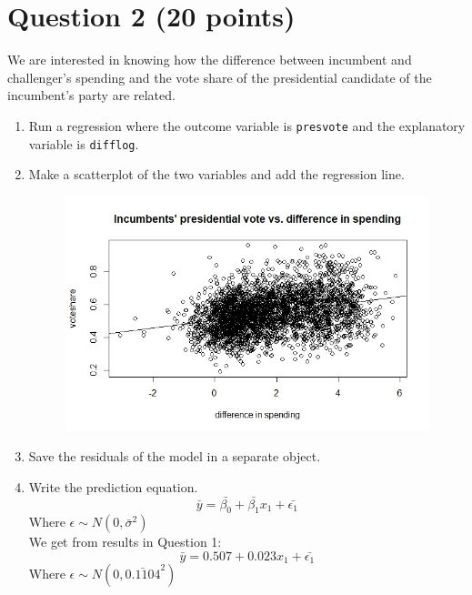 \documentclass[12pt,letterpaper]{article}
\begin{document}
\newpage

\section*{Question 2 (20 points)}
\noindent We are interested in knowing how the difference between incumbent and challenger's spending and the vote share of the presidential candidate of the incumbent's party are related.	\vspace{.25cm}
\begin{enumerate}
	\item Run a regression where the outcome variable is \texttt{presvote} and the explanatory variable is \texttt{difflog}.
	
	
	\vspace{.5cm}
	
	\item Make a scatterplot of the two variables and add the regression line.
	\begin{figure}[h!]
		\centering
		\label{figure2}
		\includegraphics[width=\textwidth]{Q2.jpeg}
	\end{figure}		
	\vspace{.5cm}
	\item Save the residuals of the model in a separate object.
	
	\vspace{.5cm}		
	\item Write the prediction equation.
	$$\bar{y} = \bar{\beta_0} + \bar{\beta_1}x_1 + \bar{\epsilon_1}$$ Where $\epsilon \sim N(0, \bar{\sigma}^2)$
	\vspace{.5cm}		
	\\We get from results in Question 1:
	$$\bar{y} = 0.507 + 0.023x_1 + \bar{\epsilon_1}$$ Where $\epsilon \sim N(0, \bar{0.1104}^2)$
	
\end{enumerate}
	
\end{document}
